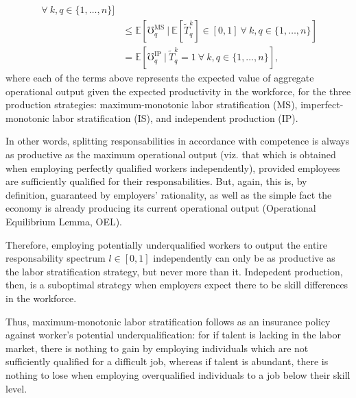\documentclass[hidelinks, nonatbib]{elsarticle}
\begin{document}
\begin{enumerate}
\begin{enumerate}
\begin{enumerate}
\begin{align}
                    \
                    \forall
                    \
                    k,q \in \{1, \dots, n\}
                ]
                \\
                &\leq
                \mathbb{E}[
                    \mho_{q}^{\text{MS}}
                    \
                    |
                    \
                    \mathbb{E}[
                        \tilde{T}_{q}^{k}
                    ]
                    \in [0,1]
                    \
                    \forall
                    \
                    k,q \in \{1, \dots, n\}
                ]
                \\
                &=
                \mathbb{E}[
                    \mho_{q}^{\text{IP}}
                    \
                    |
                    \
                    \tilde{T}_{q}^{k}
                    = 1
                    \
                    \forall
                    \
                    k,q \in \{1, \dots, n\}
                ]
                ,
            \end{align}
            where each of the terms above represents the expected value of aggregate operational output given the expected productivity in the workforce, for the three production strategies: maximum-monotonic labor stratification (MS), imperfect-monotonic labor stratification (IS), and independent production (IP).

            In other words, splitting responsabilities in accordance with competence is always as productive as the maximum operational output (viz. that which is obtained when employing perfectly qualified workers independently), provided employees are sufficiently qualified for their responsabilities. But, again, this is, by definition, guaranteed by employers' rationality, as well as the simple fact the economy is already producing its current operational output (Operational Equilibrium Lemma, OEL). 
            
            Therefore, employing potentially underqualified workers to output the entire responsability spectrum $l \in [0,1]$ independently can only be as productive as the labor stratification strategy, but never more than it. Indepedent production, then, is a suboptimal strategy when employers expect there to be skill differences in the workforce.
            
            Thus, maximum-monotonic labor stratification follows as an insurance policy against worker's potential underqualification: for if talent is lacking in the labor market, there is nothing to gain by employing individuals which are not sufficiently qualified for a difficult job, whereas if talent is abundant, there is nothing to lose when employing overqualified individuals to a job below their skill level.


\end{enumerate}
\end{enumerate}
\end{enumerate}
\end{document}

